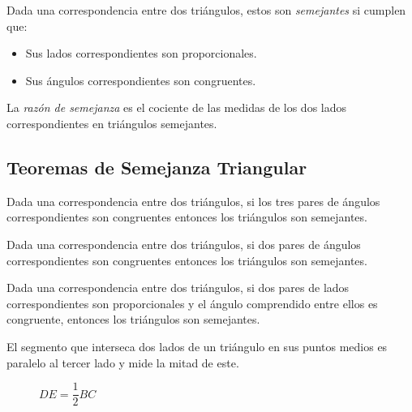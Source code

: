 \begin{definition}
    Dada una correspondencia entre dos triángulos, estos son \textit{semejantes} si cumplen que:

    \begin{itemize}
        \item Sus lados correspondientes son proporcionales.
        \item Sus ángulos correspondientes son congruentes.
    \end{itemize}
    
\end{definition}

\begin{definition}
    La \textit{razón de semejanza} es el cociente de las medidas de los dos lados correspondientes en triángulos semejantes.
\end{definition}


\subsection{Teoremas de Semejanza Triangular}

\begin{theorem}
    Dada una correspondencia entre dos triángulos, si los tres pares de ángulos correspondientes son congruentes entonces los triángulos son semejantes.
\end{theorem}


\begin{theorem}
    Dada una correspondencia entre dos triángulos, si dos pares de ángulos correspondientes son congruentes entonces los triángulos son semejantes.
\end{theorem}


\begin{theorem}
    Dada una correspondencia entre dos triángulos, si dos pares de lados correspondientes son proporcionales y el ángulo comprendido entre ellos es congruente, entonces los triángulos son semejantes.
\end{theorem}

\clearpage

\begin{theorem}
    El segmento que interseca dos lados de un triángulo en sus puntos medios es paralelo al tercer lado y mide la mitad de este.

    \begin{figure}[!h]
        \centering
        
        \caption{$DE = \dfrac{1}{2}BC$}
        \label{fig:paralela-media}
    \end{figure}    
    
\end{theorem}

